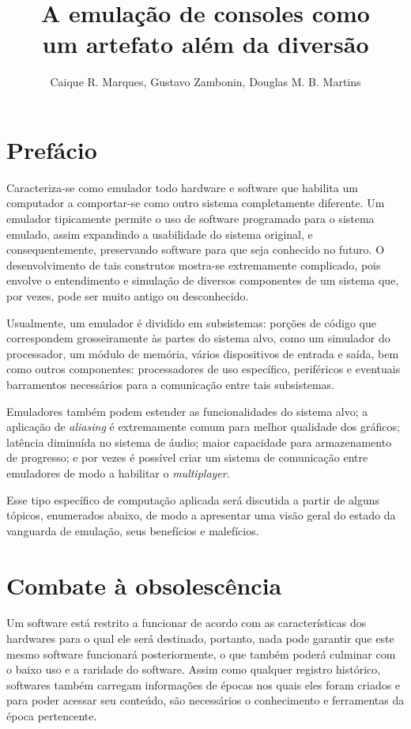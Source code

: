 \documentclass[12pt]{sftex/sftex}
\title{A emulação de consoles como \\ um artefato além da diversão}
\author{Caique R. Marques, Gustavo Zambonin, Douglas M. B. Martins}
\begin{document}
\maketitle

\section{Prefácio}

Caracteriza-se como emulador todo hardware e software que habilita um computador
a comportar-se como outro sistema completamente diferente. Um emulador
tipicamente permite o uso de software programado para o sistema emulado, assim
expandindo a usabilidade do sistema original, e consequentemente, preservando
software para que seja conhecido no futuro. O desenvolvimento de tais construtos
mostra-se extremamente complicado, pois envolve o entendimento e simulação de
diversos componentes de um sistema que, por vezes, pode ser muito antigo ou
desconhecido.

Usualmente, um emulador é dividido em subsistemas: porções de código que
correspondem grosseiramente às partes do sistema alvo, como um simulador do
processador, um módulo de memória, vários dispositivos de entrada e saída, bem
como outros componentes: processadores de uso específico, periféricos e
eventuais barramentos necessários para a comunicação entre tais subsistemas.

Emuladores também podem estender as funcionalidades do sistema alvo; a aplicação
de \emph{aliasing} é extremamente comum para melhor qualidade dos gráficos;
latência diminuída no sistema de áudio; maior capacidade para armazenamento de
progresso; e por vezes é possível criar um sistema de comunicação entre
emuladores de modo a habilitar o \emph{multiplayer}.

Esse tipo específico de computação aplicada será discutida a partir de alguns
tópicos, enumerados abaixo, de modo a apresentar uma visão geral do estado da
vanguarda de emulação, seus benefícios e malefícios.

\section{Combate à obsolescência}

Um software está restrito a funcionar de acordo com as características dos
hardwares para o qual ele será destinado, portanto, nada pode garantir que
este mesmo software funcionará posteriormente, o que também poderá culminar com
o baixo uso e a raridade do software. Assim como qualquer registro histórico,
softwares também carregam informações de épocas nos quais eles foram criados e
para poder acessar seu conteúdo, são necessários o conhecimento e ferramentas da
época pertencente.
\end{document}

